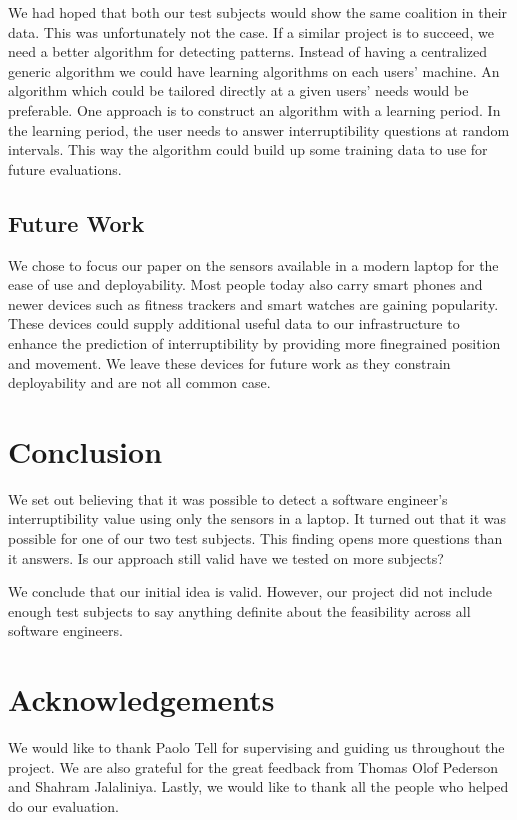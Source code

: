 \documentclass{sigchi}
\begin{document}
We had hoped that both our test subjects would show the same coalition in their data.
This was unfortunately not the case.
If a similar project is to succeed, we need a better algorithm for detecting patterns.
Instead of having a centralized generic algorithm we could have learning algorithms on each users’ machine.
An algorithm which could be tailored directly at a given users’ needs would be preferable.
One approach is to construct an algorithm with a learning period.
In the learning period, the user needs to answer interruptibility questions at random intervals.
This way the algorithm could build up some training data to use for future evaluations.

\subsection{Future Work}
We chose to focus our paper on the sensors available in a modern laptop for the ease of use and deployability.
Most people today also carry smart phones and newer devices such as fitness trackers and smart watches are gaining popularity.
These devices could supply additional useful data to our infrastructure to enhance the prediction of interruptibility by providing more finegrained position and movement.
We leave these devices for future work as they constrain deployability and are not all common case.

\section{Conclusion}
We set out believing that it was possible to detect a software engineer’s interruptibility value using only the sensors in a laptop.
It turned out that it was possible for one of our two test subjects.
This finding opens more questions than it answers. Is our approach still valid have we tested on more subjects?

We conclude that our initial idea is valid.
However, our project did not include enough test subjects to say anything definite about the feasibility across all software engineers.

\section{Acknowledgements}
We would like to thank Paolo Tell for supervising and guiding us throughout the project.
We are also grateful for the great feedback from Thomas Olof Pederson and Shahram Jalaliniya.
Lastly, we would like to thank all the people who helped do our evaluation.

\balance


\end{document}
